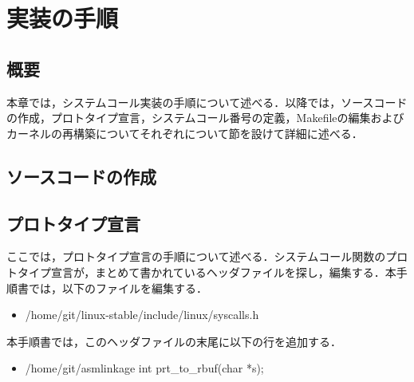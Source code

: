 \documentclass[12pt]{jsarticle}
\begin{document}
\section{実装の手順}
\subsection{概要}
本章では，システムコール実装の手順について述べる．以降では，ソースコードの作成，プロトタイプ宣言，システムコール番号の定義，Makefileの編集およびカーネルの再構築についてそれぞれについて節を設けて詳細に述べる．
\subsection{ソースコードの作成}

\subsection{プロトタイプ宣言}
ここでは，プロトタイプ宣言の手順について述べる．システムコール関数のプロトタイプ宣言が，まとめて書かれているヘッダファイルを探し，編集する．本手順書では，以下のファイルを編集する．
\begin{itemize}
\item \slash{}home\slash{}git\slash{}linux-stable\slash{}include\slash{}linux\slash{}syscalls.h
\end{itemize}
本手順書では，このヘッダファイルの末尾に以下の行を追加する．
\begin{itemize}
\item \slash{}home\slash{}git\slash{}asmlinkage int prt\_to\_rbuf(char *s);
\end{itemize}
\end{document}
